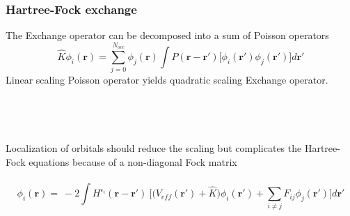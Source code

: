\documentclass[mathserif]{beamer}
\begin{document}
\begin{frame}
    \frametitle{Hartree-Fock exchange}
    The Exchange operator can be decomposed into a sum of Poisson operators
    \begin{equation}
	\nonumber
	\hat{K}\phi_i(\boldsymbol{r}) = \sum_{j=0}^{N_{occ}} \phi_j(\boldsymbol{r})
	    \int P(\boldsymbol{r} - \boldsymbol{r}') \Big[ \phi_i(\boldsymbol{r}')
	    \phi_j(\boldsymbol{r}')\Big] d\boldsymbol{r}'
    \end{equation}
    Linear scaling Poisson operator yields quadratic scaling Exchange operator.
    \ \\
    \ \\
    \ \\
    \ \\
    \ \\
    \pause
    Localization of orbitals should reduce the scaling but complicates the Hartree-Fock equations
    because of a non-diagonal Fock matrix\\
    \ \\
    \begin{equation}
	\nonumber
	\phi_i(\boldsymbol{r}) =\ -2\int H^{\epsilon_i}(\boldsymbol{r}-\boldsymbol{r}')\
	    \Big[\Big(V_{eff}(\boldsymbol{r}') + \hat{K}\Big) 
	    \phi_i(\boldsymbol{r}') + \sum_{i\neq j} F_{ij}\phi_j(\boldsymbol{r}')\Big] d\boldsymbol{r}'
    \end{equation}
\end{frame}
\end{document}
